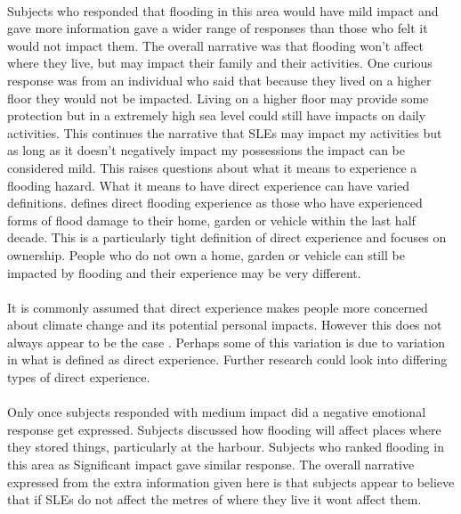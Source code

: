 \paragraph{}

Subjects who responded that flooding in this area would have mild impact and gave more information gave a wider range of responses than those who felt it would not impact them. The overall narrative was that flooding won’t affect where they live, but may impact their family and their activities. One curious response was from an individual who said that because they lived on a higher floor they would not be impacted. Living on a higher floor may provide some protection but in a extremely high sea level could still have impacts on daily activities. This continues the narrative that SLEs may impact my activities but as long as it doesn't negatively impact my possessions the impact can be considered mild. This raises questions about what it means to experience a flooding hazard. What it means to have direct experience can have varied definitions. 
\cite{whitmarsh_are_2008} defines direct flooding experience as those who have experienced forms of flood damage to their home, garden or vehicle within the last half decade. This is a particularly tight definition of direct experience and focuses on ownership. People who do not own a home, garden or vehicle can still be impacted by flooding and their experience may be very different.  
\paragraph{}
It is commonly assumed that direct experience makes people more concerned about climate change and its potential personal impacts\cite{lujala_role_2020}. However this does not always appear to be the case \cite{lujala_role_2020}. Perhaps some of this variation is due to variation in what is defined as direct experience. Further research could look into differing types of direct experience. 
\paragraph{}
Only once subjects responded with medium impact did a negative emotional response get expressed. Subjects discussed how flooding will affect places where they stored things, particularly at the harbour. Subjects who ranked flooding in this area as Significant impact gave similar response. The overall narrative expressed from the extra information given here is that subjects appear to believe that if SLEs do not affect the metres of where they live it wont affect them. 
